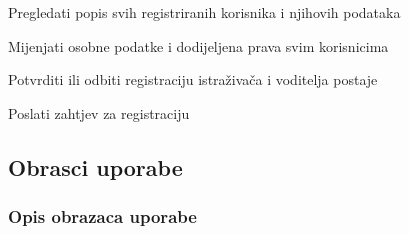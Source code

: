 \begin{packed_enum}
\begin{packed_enum}
				\end{packed_enum}
				
				\item  {}
				
				\begin{packed_enum}
					
					\item Pregledati popis svih registriranih korisnika i njihovih podataka
					\item Mijenjati osobne podatke i dodijeljena prava svim korisnicima
					\item Potvrditi ili odbiti registraciju istraživača i voditelja postaje
					
				\end{packed_enum}
				
				\item  {}
				
				\begin{packed_enum}
					
					\item Poslati zahtjev za registraciju
				
				\end{packed_enum}
				
				
			\end{packed_enum}
			
			\eject 
			
			
				
			\subsection{Obrasci uporabe}
				
				
				\subsubsection{Opis obrazaca uporabe}
				
					

